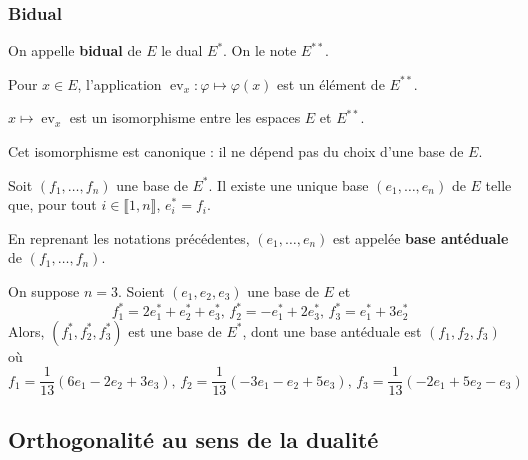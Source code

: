   \subsubsection{Bidual}


  \begin{definition}
    On appelle \textbf{bidual} de $E$ le dual $E^*$. On le note $E^{**}$.
  \end{definition}

  \begin{example}
    Pour $x \in E$, l'application $\operatorname{ev}_x : \varphi \mapsto \varphi(x)$ est un élément de $E^{**}$.
  \end{example}

  \begin{theorem}
    $x \mapsto \operatorname{ev}_x$ est un isomorphisme entre les espaces $E$ et $E^{**}$.
  \end{theorem}

  \begin{remark}
    Cet isomorphisme est canonique : il ne dépend pas du choix d'une base de $E$.
  \end{remark}

  \begin{corollary}
    Soit $(f_1, \dots, f_n)$ une base de $E^*$. Il existe une unique base $(e_1, \dots, e_n)$ de $E$ telle que, pour tout $i \in \llbracket 1, n \rrbracket$, $e_i^* = f_i$.
  \end{corollary}

  \begin{definition}
    En reprenant les notations précédentes, $(e_1, \dots, e_n)$ est appelée \textbf{base antéduale} de $(f_1, \dots, f_n)$.
  \end{definition}

  \begin{example}
    On suppose $n = 3$. Soient $(e_1, e_2, e_3)$ une base de $E$ et
    \[ f_1^* = 2e_1^* + e_2^* + e_3^*, \, f_2^* = -e_1^* + 2e_3^*, \, f_3^* = e_1^* + 3e_2^* \]
    Alors, $(f_1^*, f_2^*, f_3^*)$ est une base de $E^*$, dont une base antéduale est $(f_1, f_2, f_3)$ où
    \[ f_1 = \frac{1}{13}(6e_1 - 2e_2 + 3e_3), \, f_2 = \frac{1}{13}(-3e_1 - e_2 + 5e_3), \, f_3 = \frac{1}{13}(-2e_1 + 5e_2 - e_3) \]
  \end{example}

  \subsection{Orthogonalité au sens de la dualité}

